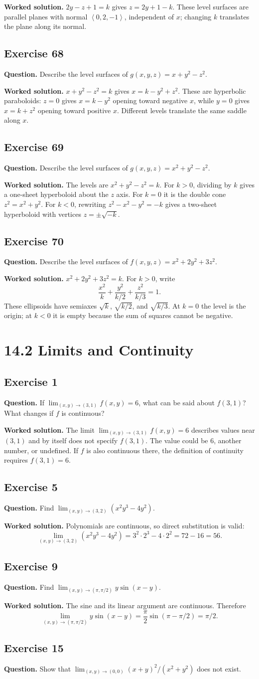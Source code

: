\documentclass[11pt]{article}
\newcommand{\ex}[1]{\Needspace{8\baselineskip}\subsection*{Exercise #1}}
\newcommand{\ans}[1]{\boxed{#1}}
\newcommand{\vv}[1]{\left\langle #1\right\rangle}
\begin{document}
\textbf{Worked solution.}
$2y-z+1=k$ gives $\ans{z=2y+1-k}$. These level surfaces are parallel planes with normal $\vv{0,2,-1}$, independent of $x$; changing $k$ translates the plane along its normal.
\ex{68}
\textbf{Question.} Describe the level surfaces of $g(x,y,z)=x+y^2-z^2$.

\textbf{Worked solution.}
$x+y^2-z^2=k$ gives $\ans{x=k-y^2+z^2}$. These are hyperbolic paraboloids: $z=0$ gives $x=k-y^2$ opening toward negative $x$, while $y=0$ gives $x=k+z^2$ opening toward positive $x$. Different levels translate the same saddle along $x$.
\ex{69}
\textbf{Question.} Describe the level surfaces of $g(x,y,z)=x^2+y^2-z^2$.

\textbf{Worked solution.}
The levels are $x^2+y^2-z^2=k$. For $k>0$, dividing by $k$ gives a one-sheet hyperboloid about the $z$ axis. For $k=0$ it is the double cone $z^2=x^2+y^2$. For $k<0$, rewriting $z^2-x^2-y^2=-k$ gives a two-sheet hyperboloid with vertices $z=\pm\sqrt{-k}$.
\ex{70}
\textbf{Question.} Describe the level surfaces of $f(x,y,z)=x^2+2y^2+3z^2$.

\textbf{Worked solution.}
$x^2+2y^2+3z^2=k$. For $k>0$, write
\[\frac{x^2}{k}+\frac{y^2}{k/2}+\frac{z^2}{k/3}=1.\]
These ellipsoids have semiaxes $\sqrt{k}$, $\sqrt{k/2}$, and $\sqrt{k/3}$. At $k=0$ the level is the origin; at $k<0$ it is empty because the sum of squares cannot be negative.
\clearpage\section*{14.2 Limits and Continuity}
\ex{1}
\textbf{Question.} If $\lim_{(x,y)\to(3,1)}f(x,y)=6$, what can be said about $f(3,1)$? What changes if $f$ is continuous?

\textbf{Worked solution.}
The limit $\lim_{(x,y)\to(3,1)}f(x,y)=6$ describes values near $(3,1)$ and by itself does not specify $f(3,1)$. The value could be $6$, another number, or undefined. If $f$ is also continuous there, the definition of continuity requires $\ans{f(3,1)=6}$.
\ex{5}
\textbf{Question.} Find $\lim_{(x,y)\to(3,2)}(x^2y^3-4y^2)$.

\textbf{Worked solution.}
Polynomials are continuous, so direct substitution is valid:
\[\lim_{(x,y)\to(3,2)}(x^2y^3-4y^2)=3^2\cdot2^3-4\cdot2^2=72-16=\ans{56}.\]
\ex{9}
\textbf{Question.} Find $\lim_{(x,y)\to(\pi,\pi/2)}y\sin(x-y)$.

\textbf{Worked solution.}
The sine and its linear argument are continuous. Therefore
\[\lim_{(x,y)\to(\pi,\pi/2)}y\sin(x-y)=\frac\pi2\sin(\pi-\pi/2)=\ans{\pi/2}.\]
\ex{15}
\textbf{Question.} Show that $\lim_{(x,y)\to(0,0)}(x+y)^2/(x^2+y^2)$ does not exist.
\end{document}

